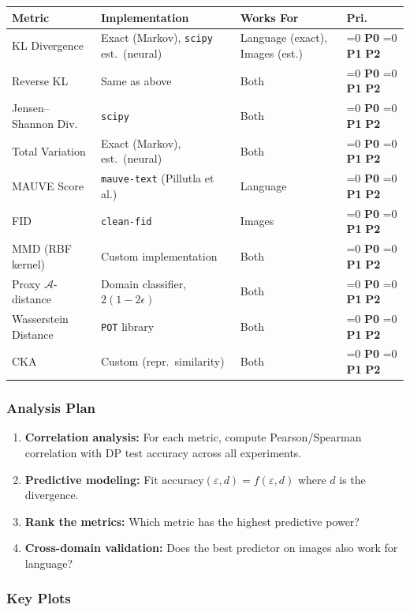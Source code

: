\documentclass[11pt,a4paper]{article}
\newcommand{\ptag}[1]{%
    \ifnum\pdfstrcmp{#1}{P0}=0
        {\textcolor{p0color}{\textbf{P0}}}%
    \else\ifnum\pdfstrcmp{#1}{P1}=0
        {\textcolor{p1color}{\textbf{P1}}}%
    \else
        {\textcolor{p2color}{\textbf{P2}}}%
    \fi\fi
}
\begin{document}
\begin{small}
\begin{longtable}{@{}p{3.2cm}p{3.8cm}p{2.5cm}p{0.6cm}@{}}
\toprule
\textbf{Metric} & \textbf{Implementation} & \textbf{Works For} & \textbf{Pri.} \\
\midrule
\endhead
KL Divergence & Exact (Markov), \texttt{scipy} est.\ (neural) & Language (exact), Images (est.) & \ptag{P0} \\
Reverse KL & Same as above & Both & \ptag{P0} \\
Jensen--Shannon Div. & \texttt{scipy} & Both & \ptag{P0} \\
Total Variation & Exact (Markov), est.\ (neural) & Both & \ptag{P0} \\
MAUVE Score & \texttt{mauve-text} (Pillutla et al.) & Language & \ptag{P0} \\
FID & \texttt{clean-fid} & Images & \ptag{P0} \\
MMD (RBF kernel) & Custom implementation & Both & \ptag{P1} \\
Proxy $\mathcal{A}$-distance & Domain classifier, $2(1-2\epsilon)$ & Both & \ptag{P1} \\
Wasserstein Distance & \texttt{POT} library & Both & \ptag{P1} \\
CKA & Custom (repr.\ similarity) & Both & \ptag{P2} \\
\bottomrule
\end{longtable}
\end{small}

\subsubsection{Analysis Plan}

\begin{enumerate}[nosep]
    \item \textbf{Correlation analysis:} For each metric, compute Pearson/Spearman correlation with DP test accuracy across all experiments.
    \item \textbf{Predictive modeling:} Fit $\text{accuracy}(\varepsilon, d) = f(\varepsilon, d)$ where $d$ is the divergence.
    \item \textbf{Rank the metrics:} Which metric has the highest predictive power?
    \item \textbf{Cross-domain validation:} Does the best predictor on images also work for language?
\end{enumerate}

\subsubsection{Key Plots}
\end{document}
